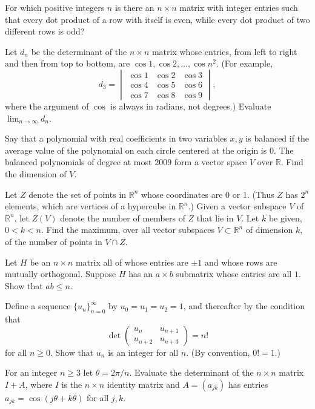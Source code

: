 \documentclass[12pt]{article}
\begin{document}
\begin{problems}
\item For which positive integers $n$ is there an $n\times n$ matrix with integer entries such that every dot product of a row with itself is even, while every dot product of two different rows is odd?

\item Let $d_n$ be the determinant of the $n\times n$ matrix whose entries, from left to right and then from top to bottom, are $\cos 1,\cos 2,\dots,\cos n^2$. (For example,
\[
d_3 = \begin{vmatrix}\cos1 & \cos2 & \cos3\\ \cos4 & \cos5 & \cos6\\ \cos7 & \cos8 & \cos9\end{vmatrix},
\]
where the argument of $\cos$ is always in radians, not degrees.) Evaluate $\lim_{n\to\infty} d_n$.

\item Say that a polynomial with real coefficients in two variables $x,y$ is balanced if the average value of the polynomial on each circle centered at the origin is $0$. The balanced polynomials of degree at most $2009$ form a vector space $V$ over $\mathbb{R}$. Find the dimension of $V$.

\item Let $Z$ denote the set of points in $\mathbb{R}^n$ whose coordinates are $0$ or $1$. (Thus $Z$ has $2^n$ elements, which are vertices of a hypercube in $\mathbb{R}^n$.) Given a vector subspace $V$ of $\mathbb{R}^n$, let $Z(V)$ denote the number of members of $Z$ that lie in $V$. Let $k$ be given, $0<k<n$. Find the maximum, over all vector subspaces $V\subset\mathbb{R}^n$ of dimension $k$, of the number of points in $V\cap Z$.

\item Let $H$ be an $n\times n$ matrix all of whose entries are $\pm 1$ and whose rows are mutually orthogonal. Suppose $H$ has an $a\times b$ submatrix whose entries are all $1$. Show that $ab\le n$.

\item Define a sequence $\{u_n\}_{n=0}^\infty$ by $u_0=u_1=u_2=1$, and thereafter by the condition that
\[
\det\begin{pmatrix}u_n & u_{n+1}\\ u_{n+2} & u_{n+3}\end{pmatrix} = n!
\]
for all $n\ge 0$. Show that $u_n$ is an integer for all $n$. (By convention, $0!=1$.)

\item For an integer $n\ge 3$ let $\theta=2\pi/n$. Evaluate the determinant of the $n\times n$ matrix $I+A$, where $I$ is the $n\times n$ identity matrix and $A=(a_{jk})$ has entries $a_{jk} = \cos(j\theta+k\theta)$ for all $j,k$.


\end{problems}
\end{document}
